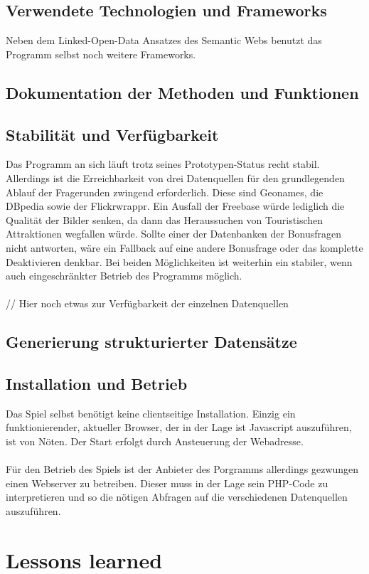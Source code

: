 \documentclass[a4paper, 11pt]{article}
\begin{document}
\subsection{Verwendete Technologien und Frameworks}
Neben dem Linked-Open-Data Ansatzes des Semantic Webs benutzt das Programm selbst noch weitere Frameworks.
\subsection{Dokumentation der Methoden und Funktionen}
\subsection{Stabilität und Verfügbarkeit}
Das Programm an sich läuft trotz seines Prototypen-Status recht stabil. Allerdings ist die Erreichbarkeit von drei Datenquellen für den grundlegenden Ablauf der Fragerunden zwingend erforderlich. Diese sind Geonames, die DBpedia sowie der Flickrwrappr. Ein Ausfall der Freebase würde lediglich die Qualität der Bilder senken, da dann das Heraussuchen von Touristischen Attraktionen wegfallen würde. Sollte einer der Datenbanken der Bonusfragen nicht antworten, wäre ein Fallback auf eine andere Bonusfrage oder das komplette Deaktivieren denkbar. Bei beiden Möglichkeiten ist weiterhin ein stabiler, wenn auch eingeschränkter Betrieb des Programms möglich.\\\\ 
// Hier noch etwas zur Verfügbarkeit der einzelnen Datenquellen
\subsection{Generierung strukturierter Datensätze}
\subsection{Installation und Betrieb}
Das Spiel selbst benötigt keine clientseitige Installation. Einzig ein funktionierender, aktueller Browser, der in der Lage ist Javascript auszuführen, ist von Nöten. Der Start erfolgt durch Ansteuerung der Webadresse.\\\\
Für den Betrieb des Spiels ist der Anbieter des Porgramms allerdings gezwungen einen Webserver zu betreiben. Dieser muss in der Lage sein PHP-Code zu interpretieren und so die nötigen Abfragen auf die verschiedenen Datenquellen auszuführen.
\newpage
\section{Lessons learned}
\end{document}
